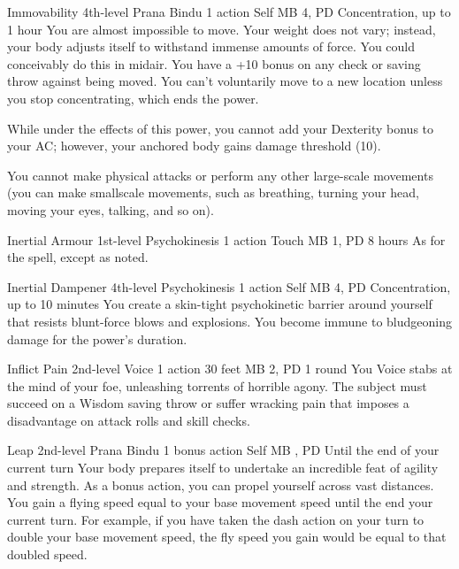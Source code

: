 \DndPowerHeader%
  {Immovability}
  {4th-level Prana Bindu}
  {1 action}
  {Self}
  {MB 4, PD \lvlfour}
  {Concentration, up to 1 hour}
  You are almost impossible to move.
  Your weight does not vary;
  instead, your body adjusts itself to withstand
  immense amounts of force.
  You could conceivably do this in midair.
  You have a +10 bonus on any check or saving throw
  against being moved.
  You can't voluntarily move to a new location
  unless you stop concentrating, which ends the power.

  While under the effects of this power,
  you cannot add your Dexterity bonus to your AC;
  however, your anchored body gains damage threshold (10).
  
  You cannot make physical attacks
  or perform any other large-scale movements
  (you can make smallscale movements,
  such as breathing,
  turning your head,
  moving your eyes,
  talking, and so on).

\DndPowerHeader%
  {Inertial Armour}
  {1st-level Psychokinesis}
  {1 action}
  {Touch}
  {MB 1, PD \lvlone}
  {8 hours}
As for the  spell, except as noted.

\DndPowerHeader%
  {Inertial Dampener}
  {4th-level Psychokinesis}
  {1 action}
  {Self}
  {MB 4, PD \lvlfour}
  {Concentration, up to 10 minutes}
  You create a skin-tight psychokinetic barrier around yourself
  that resists blunt-force blows and explosions.
  You become immune to bludgeoning damage for the power's duration.

\DndPowerHeader%
  {Inflict Pain}
  {2nd-level Voice}
  {1 action}
  {30 feet}
  {MB 2, PD \lvltwo}
  {1 round}
  You Voice stabs at the mind of your foe,
  unleashing torrents of horrible agony.
  The subject must succeed on a Wisdom saving throw or
  suffer wracking pain that imposes a disadvantage on attack rolls
  and skill checks.

\DndPowerHeader%
  {Leap}
  {2nd-level Prana Bindu}
  {1 bonus action}
  {Self}
  {MB , PD \lvltwo}
  {Until the end of your current turn}
Your body prepares itself to undertake an incredible feat
of agility and strength.
As a bonus action,
you can propel yourself across vast distances.
You gain a flying speed equal to your base movement speed
until the end your current turn.
For example,
if you have taken the dash action on your turn to double
your base movement speed,
the fly speed you gain would be equal to that doubled speed.
 

